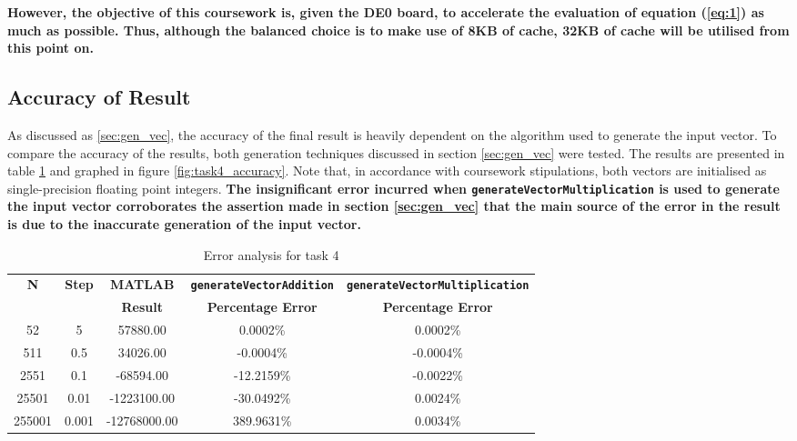 \documentclass{article}
\begin{document}
\textbf{However, the objective of this coursework is, given the DE0 board, to accelerate the evaluation of equation (\ref{eq:1}) as much as possible. Thus, although the balanced choice is to make use of 8KB of cache, 32KB of cache will be utilised from this point on.}

\subsection{Accuracy of Result}

As discussed as \ref{sec:gen_vec}, the accuracy of the final result is heavily dependent on the algorithm used to generate the input vector. To compare the accuracy of the results, both generation techniques discussed in section \ref{sec:gen_vec} were tested. The results are presented in table \ref{tab:task4_accuracy} and graphed in figure \ref{fig:task4_accuracy}. Note that, in accordance with coursework stipulations, both vectors are initialised as single-precision floating point integers. \textbf{The insignificant error incurred when {\tt generateVectorMultiplication} is used to generate the input vector corroborates the assertion made in section \ref{sec:gen_vec} that the main source of the error in the result is due to the inaccurate generation of the input vector.}

\begin{table}[H]
  \centering
    \begin{tabular}{|c|c|c|c|c|}
    \hline
    \multirow{2}{*}{\textbf{N}} & \multirow{2}{*}{\textbf{Step}} & \textbf{MATLAB} & \textbf{{\tt generateVectorAddition}} & \textbf{{\tt generateVectorMultiplication}} \\
\cline{4-5}          &       & \textbf{Result} & \textbf{Percentage Error} & \textbf{Percentage Error} \\
    \hline
    52    & 5     & 57880.00 & 0.0002\% & 0.0002\% \\
    \hline
    511   & 0.5   & 34026.00 & -0.0004\% & -0.0004\% \\
    \hline
    2551  & 0.1   & -68594.00 & -12.2159\% & -0.0022\% \\
    \hline
    25501 & 0.01  & -1223100.00 & -30.0492\% & 0.0024\% \\
    \hline
    255001 & 0.001 & -12768000.00 & 389.9631\% & 0.0034\% \\
    \hline
    \end{tabular}%
  \caption{Error analysis for task 4}
  \label{tab:task4_accuracy}%
\end{table}%
\end{document}
